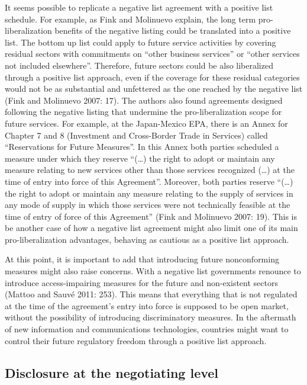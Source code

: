 \documentclass{article}
\begin{document}
It seems possible to replicate a negative list agreement with a positive list schedule. For example, as Fink and Molinuevo explain, the long term pro-liberalization benefits of the negative listing could be translated into a positive list. The bottom up list could apply to future service activities by covering residual sectors with commitments on “other business services” or “other services not included elsewhere”. Therefore, future sectors could be also liberalized through a positive list approach, even if the coverage for these residual categories would not be as substantial and unfettered as the one reached by the negative list (Fink and Molinuevo 2007: 17). The authors also found agreements designed following the negative listing that undermine the pro-liberalization scope for future services. For example, at the Japan-Mexico EPA, there is an Annex for Chapter 7 and 8 (Investment and Cross-Border Trade in Services) called “Reservations for Future Measures”. In this Annex both parties scheduled a measure under which they reserve “(…) the right to adopt or maintain any measure relating to new services other than those services recognized (…) at the time of entry into force of this Agreement”. Moreover, both parties reserve “(…) the right to adopt or maintain any measure relating to the supply of services in any mode of supply in which those services were not technically feasible at the time of entry of force of this Agreement” (Fink and Molinuevo 2007: 19). This is be another case of how a negative list agreement might also limit one of its main pro-liberalization advantages, behaving as cautious as a positive list approach.

\smallskip

At this point, it is important to add that introducing future nonconforming measures might also raise concerns. With a negative list governments renounce to introduce access-impairing measures for the future and non-existent sectors (Mattoo and Sauvé 2011: 253). This means that everything that is not regulated at the time of the agreement’s entry into force is supposed to be open market, without the possibility of introducing discriminatory measures. In the aftermath of new information and communications technologies, countries might want to control their future regulatory freedom through a positive list approach.

\subsection{Disclosure at the negotiating level}
\end{document}
